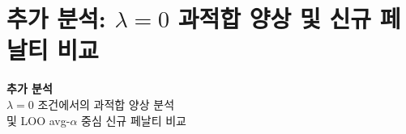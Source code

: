 \documentclass[aspectratio=169,10pt]{beamer}
\begin{document}
\section{추가 분석: $\lambda=0$ 과적합 양상 및 신규 페날티 비교}

\begin{frame}[plain]
	\begin{center}
		{\Large\bfseries 추가 분석}\\[0.5em]
		{\large $\lambda=0$ 조건에서의 과적합 양상 분석}\\[0.3em]
		{\large 및 LOO avg-$\alpha$ 중심 신규 페날티 비교}
	\end{center}
\end{frame}
\end{document}
